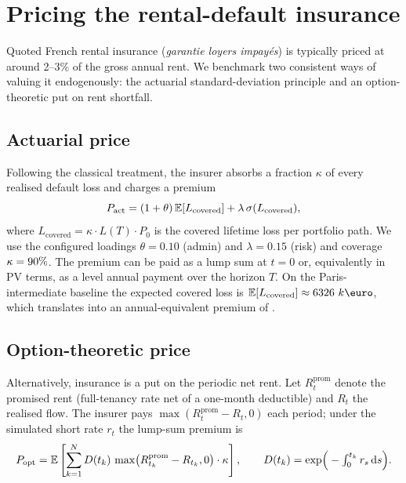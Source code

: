 \section{Pricing the rental-default insurance}\label{sec:insurance}

Quoted French rental insurance (\textit{garantie loyers impayés}) is
typically priced at around 2--3\% of the gross annual rent. We benchmark
two consistent ways of valuing it endogenously: the actuarial
standard-deviation principle and an option-theoretic put on rent
shortfall.

\subsection{Actuarial price}

Following the classical \autocite{EmbrechtsMcNeilStraumann2002} treatment,
the insurer absorbs a fraction $\kappa$ of every realised default loss and
charges a premium
\begin{equation}
P_\text{act} = (1 + \theta)\, \mathbb{E}[L_\text{covered}] + \lambda\,
\sigma(L_\text{covered}),
\label{eq:act-premium}
\end{equation}
where $L_\text{covered} = \kappa \cdot L(T) \cdot P_0$ is the covered
lifetime loss per portfolio path. We use the configured loadings
$\theta = 0.10$ (admin) and $\lambda = 0.15$ (risk) and coverage $\kappa =
90\%{}$. The premium can be paid as a lump sum at $t = 0$
or, equivalently in PV terms, as a level annual payment over the horizon
$T$. On the Paris-intermediate baseline the expected covered loss is
$\E[L_\text{covered}] \approx \insuranceExpectedLoss{}$, which translates
into an annual-equivalent premium of \insuranceAnnualPremium{}.

\subsection{Option-theoretic price}

Alternatively, insurance is a put on the periodic net rent. Let
$R^{\text{prom}}_t$ denote the promised rent (full-tenancy rate net of a
one-month deductible) and $R_t$ the realised flow. The insurer pays
$\max(R^{\text{prom}}_t - R_t, 0)$ each period; under the simulated short
rate $r_t$ the lump-sum premium is
\begin{equation}
P_\text{opt} = \mathbb{E}\left[\sum_{k=1}^{N} D(t_k)\,
\max\bigl(R^{\text{prom}}_{t_k} - R_{t_k}, 0\bigr) \cdot \kappa
\right],
\qquad D(t_k) = \exp\!\Big(-\textstyle\int_0^{t_k} r_s\,\mathrm{d}s\Big).
\label{eq:opt-premium}
\end{equation}

